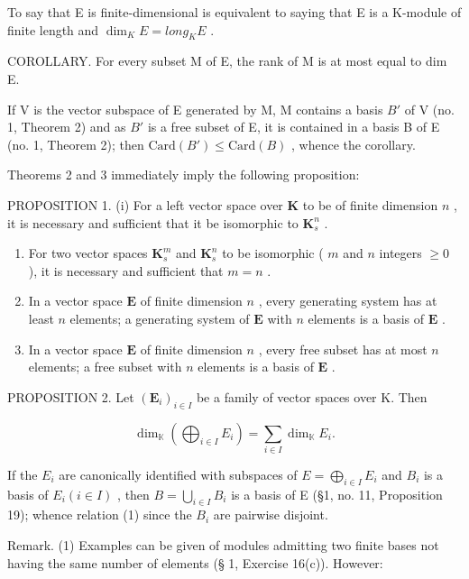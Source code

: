 To say that E is finite-dimensional is equivalent to saying that E is a K-module of finite length and \(\dim_{K}E = long_{K}E\) .

COROLLARY. For every subset M of E, the rank of M is at most equal to dim E.

If V is the vector subspace of E generated by M, M contains a basis \(B'\) of V (no. 1, Theorem 2) and as \(B'\) is a free subset of E, it is contained in a basis B of E (no. 1, Theorem 2); then \(\text{Card}(B') \leqslant \text{Card}(B)\) , whence the corollary.

Theorems 2 and 3 immediately imply the following proposition:

PROPOSITION 1. (i) For a left vector space over \(\mathbf{K}\) to be of finite dimension \(n\) , it is necessary and sufficient that it be isomorphic to \(\mathbf{K}_s^n\) .

\begin{enumerate}
\def\labelenumi{(\roman{enumi})}
\setcounter{enumi}{1}
\item
  For two vector spaces \(\mathbf{K}_s^m\) and \(\mathbf{K}_s^n\) to be isomorphic ( \(m\) and \(n\) integers \(\geqslant 0\) ), it is necessary and sufficient that \(m = n\) .
\item
  In a vector space \(\mathbf{E}\) of finite dimension \(n\) , every generating system has at least \(n\) elements; a generating system of \(\mathbf{E}\) with \(n\) elements is a basis of \(\mathbf{E}\) .
\item
  In a vector space \(\mathbf{E}\) of finite dimension \(n\) , every free subset has at most \(n\) elements; a free subset with \(n\) elements is a basis of \(\mathbf{E}\) .
\end{enumerate}

PROPOSITION 2. Let \((\mathbf{E}_i)_{i\in I}\) be a family of vector spaces over K. Then

\[
\dim_ {\mathbb {K}} \left(\bigoplus_ {i \in I} E _ {i}\right) = \sum_ {i \in I} \dim_ {\mathbb {K}} E _ {i}.\tag{1}
\]

If the \(E_{i}\) are canonically identified with subspaces of \(E = \bigoplus_{i \in I} E_{i}\) and \(B_{i}\) is a basis of \(E_{i} (i \in I)\) , then \(B = \bigcup_{i \in I} B_{i}\) is a basis of E (§1, no. 11, Proposition 19); whence relation (1) since the \(B_{i}\) are pairwise disjoint.

Remark. (1) Examples can be given of modules admitting two finite bases not having the same number of elements (§ 1, Exercise 16(c)). However:

